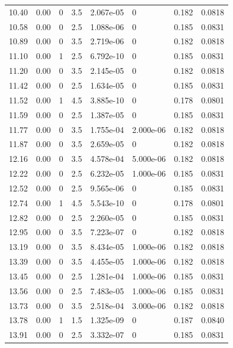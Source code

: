\documentclass[preview]{standalone}
\begin{document}
{{{\begin{tabular}{L{1.2cm}C{1.2cm} C{0.3cm}C{0.5cm} C{1.4cm}C{1.4cm} C{1.4cm}C{1.4cm}}
  10.40  &  0.00  & 0     & 3.5 &  2.067e-05  & 0  & 0.182 &  0.0818   \\ 
  10.58  &  0.00  & 0     & 2.5 &  1.088e-06  & 0  & 0.185 &  0.0831   \\ 
  10.89  &  0.00  & 0     & 3.5 &  2.719e-06  & 0  & 0.182 &  0.0818   \\ 
  11.10  &  0.00  & 1     & 2.5 &  6.792e-10  & 0  & 0.185 &  0.0831   \\ 
  11.20  &  0.00  & 0     & 3.5 &  2.145e-05  & 0  & 0.182 &  0.0818   \\ 
  11.42  &  0.00  & 0     & 2.5 &  1.634e-05  & 0  & 0.185 &  0.0831   \\ 
  11.52  &  0.00  & 1     & 4.5 &  3.885e-10  & 0  & 0.178 &  0.0801   \\ 
  11.59  &  0.00  & 0     & 2.5 &  1.387e-05  & 0  & 0.185 &  0.0831   \\ 
  11.77  &  0.00  & 0     & 3.5 &  1.755e-04  & 2.000e-06  & 0.182 &  0.0818   \\ 
  11.87  &  0.00  & 0     & 3.5 &  2.659e-05  & 0  & 0.182 &  0.0818   \\ 
  12.16  &  0.00  & 0     & 3.5 &  4.578e-04  & 5.000e-06  & 0.182 &  0.0818   \\ 
  12.22  &  0.00  & 0     & 2.5 &  6.232e-05  & 1.000e-06  & 0.185 &  0.0831   \\ 
  12.52  &  0.00  & 0     & 2.5 &  9.565e-06  & 0  & 0.185 &  0.0831   \\ 
  12.74  &  0.00  & 1     & 4.5 &  5.543e-10  & 0  & 0.178 &  0.0801   \\ 
  12.82  &  0.00  & 0     & 2.5 &  2.260e-05  & 0  & 0.185 &  0.0831   \\ 
  12.95  &  0.00  & 0     & 3.5 &  7.223e-07  & 0  & 0.182 &  0.0818   \\ 
  13.19  &  0.00  & 0     & 3.5 &  8.434e-05  & 1.000e-06  & 0.182 &  0.0818   \\ 
  13.39  &  0.00  & 0     & 3.5 &  4.455e-05  & 1.000e-06  & 0.182 &  0.0818   \\ 
  13.45  &  0.00  & 0     & 2.5 &  1.281e-04  & 1.000e-06  & 0.185 &  0.0831   \\ 
  13.56  &  0.00  & 0     & 2.5 &  7.483e-05  & 1.000e-06  & 0.185 &  0.0831   \\ 
  13.73  &  0.00  & 0     & 3.5 &  2.518e-04  & 3.000e-06  & 0.182 &  0.0818   \\ 
  13.78  &  0.00  & 1     & 1.5 &  1.325e-09  & 0  & 0.187 &  0.0840   \\ 
  13.91  &  0.00  & 0     & 2.5 &  3.332e-07  & 0  & 0.185 &  0.0831   \\ 

\end{tabular}}}}
\end{document}
